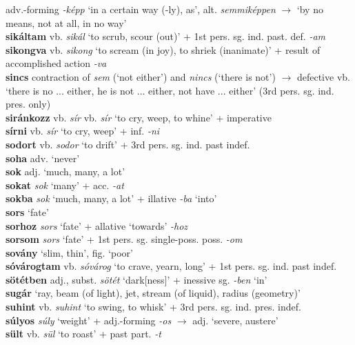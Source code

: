 \documentclass[11pt]{article}
\begin{document}
adv.\hyp{}forming \emph{-képp} `in a certain way (-ly), as',
alt. \emph{semmiképpen} $\rightarrow$ `by no means, not at all, in no
way'\\
\textbf{sikáltam} vb. \emph{sikál} `to scrub, scour (out)' + 1st
pers. sg. ind. past. def. \emph{-am} \\
\textbf{sikongva} vb. \emph{sikong} `to scream (in joy), to shriek
(inanimate)' + result of accomplished action \emph{-va} \\
\textbf{sincs} contraction of \emph{sem} (`not either')
and \emph{nincs} (`there is not') $\rightarrow$ defective vb. `there
is no ... either, he is not ... either, not have ... either' (3rd
pers. sg. ind. pres. only) \\
\textbf{siránkozz} vb. \emph{sír} vb. \emph{sír} `to cry, weep, to whine' + imperative \\
\textbf{sírni} vb. \emph{sír} `to cry, weep' + inf. \emph{-ni} \\
\textbf{sodort} vb. \emph{sodor} `to drift' + 3rd pers. sg. ind. past
indef. \\
\textbf{soha} adv. `never' \\
\textbf{sok} adj. `much, many, a lot' \\
\textbf{sokat} \emph{sok} `many' + acc. \emph{-at} \\
\textbf{sokba} \emph{sok} `much, many, a lot' + illative \emph{-ba}
`into' \\
\textbf{sors} `fate' \\
\textbf{sorhoz} \emph{sors} `fate' + allative `towards' \emph{-hoz} \\
\textbf{sorsom} \emph{sors} `fate' + 1st
pers. sg. single\hyp{}poss. poss. \emph{-om} \\
\textbf{sovány} `slim, thin', fig. `poor' \\
\textbf{sóvárogtam} vb. \emph{sóvárog} `to crave, yearn, long' + 1st
pers. sg. ind. past indef. \\
\textbf{sötétben} adj., subst. \emph{sötét} `dark[ness]' +
inessive sg. \emph{-ben} `in' \\
\textbf{sugár} `ray, beam (of light), jet, stream (of liquid), radius
(geometry)' \\
\textbf{suhint} vb. \emph{suhint} `to swing, to whisk' + 3rd
pers. sg. ind. pres. indef. \\
\textbf{súlyos} \emph{súly} `weight' + adj.\hyp{}forming \emph{-os}
$\rightarrow$ adj. `severe, austere' \\
\textbf{sült} vb. \emph{sül} `to roast' + past part. \emph{-t} \\
\end{document}
